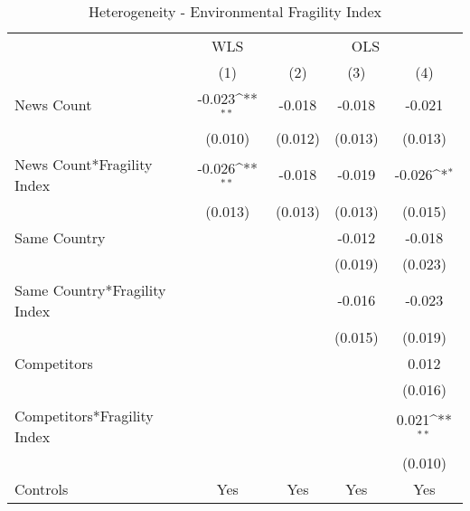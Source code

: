 \begin{table}[htbp]\centering
\def\sym#1{\ifmmode^{#1}\else\(^{#1}\)\fi}
\caption{Heterogeneity - Environmental Fragility Index}
\begin{tabular}{l*{4}{c}}
\toprule
                    &\multicolumn{1}{c}{WLS}&\multicolumn{3}{c}{OLS}                                          \\\cmidrule(lr){2-2}\cmidrule(lr){3-5}
                    &\multicolumn{1}{c}{(1)}         &\multicolumn{1}{c}{(2)}         &\multicolumn{1}{c}{(3)}         &\multicolumn{1}{c}{(4)}         \\
\midrule
News Count          &      -0.023\sym{**} &      -0.018         &      -0.018         &      -0.021         \\
                    &     (0.010)         &     (0.012)         &     (0.013)         &     (0.013)         \\
\addlinespace
News Count*Fragility Index&      -0.026\sym{**} &      -0.018         &      -0.019         &      -0.026\sym{*}  \\
                    &     (0.013)         &     (0.013)         &     (0.013)         &     (0.015)         \\
\addlinespace
Same Country        &                     &                     &      -0.012         &      -0.018         \\
                    &                     &                     &     (0.019)         &     (0.023)         \\
\addlinespace
Same Country*Fragility Index&                     &                     &      -0.016         &      -0.023         \\
                    &                     &                     &     (0.015)         &     (0.019)         \\
\addlinespace
Competitors         &                     &                     &                     &       0.012         \\
                    &                     &                     &                     &     (0.016)         \\
\addlinespace
Competitors*Fragility Index&                     &                     &                     &       0.021\sym{**} \\
                    &                     &                     &                     &     (0.010)         \\
\midrule
Controls            &         Yes         &         Yes         &         Yes         &         Yes         \\

\end{tabular}
\end{table}
